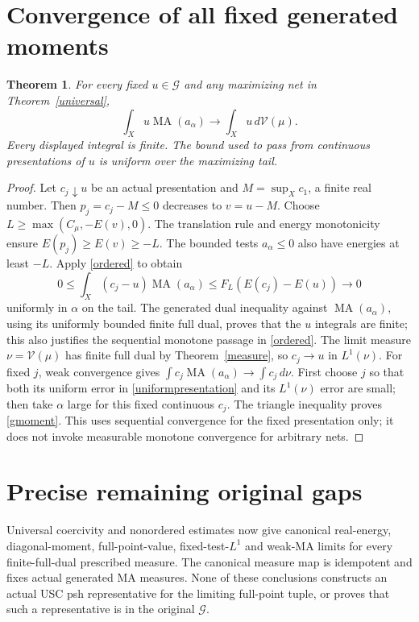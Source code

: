 \documentclass[11pt]{article}
\newtheorem{theorem}{Theorem}
\newcommand{\G}{\mathcal G}
\newcommand{\MA}{\operatorname{MA}}
\begin{document}
\section{Convergence of all fixed generated moments}
\begin{theorem}\label{generatedmoment}
For every fixed $u\in\G$ and any maximizing net in
Theorem~\ref{universal},
\begin{equation}\label{gmoment}
 \int_Xu\MA(a_\alpha)\longrightarrow
                      \int_Xu\,d\mathcal V(\mu).
\end{equation}
Every displayed integral is finite. The bound used to pass from
continuous presentations of $u$ is uniform over the maximizing tail.
\end{theorem}
\begin{proof}
Let $c_j\downarrow u$ be an actual presentation and
$M=\sup_Xc_1$, a finite real number. Then $p_j=c_j-M\le0$
decreases to $v=u-M$. Choose
$L\ge\max(C_\mu,-E(v),0)$. The translation rule and energy
monotonicity ensure $E(p_j)\ge E(v)\ge-L$.
The bounded tests $a_\alpha\le0$ also have energies at least
$-L$. Apply \eqref{ordered} to obtain
\begin{equation}\label{uniformpresentation}
 0\le\int_X(c_j-u)\MA(a_\alpha)
       \le F_L(E(c_j)-E(u))\longrightarrow0
\end{equation}
uniformly in $\alpha$ on the tail. The generated dual inequality
against $\MA(a_\alpha)$, using its uniformly bounded finite
full dual, proves that the $u$ integrals are finite; this also
justifies the sequential monotone passage in \eqref{ordered}.
The limit measure $\nu=\mathcal V(\mu)$ has finite full dual
by Theorem~\ref{measure}, so $c_j\to u$ in $L^1(\nu)$.
For fixed $j$, weak convergence gives
$\int c_j\MA(a_\alpha)\to\int c_j\,d\nu$.
First choose $j$ so that both its uniform error in
\eqref{uniformpresentation} and its $L^1(\nu)$ error are small;
then take $\alpha$ large for this fixed continuous $c_j$.
The triangle inequality proves \eqref{gmoment}.
This uses sequential convergence for the fixed presentation only;
it does not invoke measurable monotone convergence for arbitrary nets.
\end{proof}

\section{Precise remaining original gaps}
Universal coercivity and nonordered estimates now give canonical
real-energy, diagonal-moment, full-point-value, fixed-test-$L^1$ and
weak-MA limits for every finite-full-dual prescribed measure.
The canonical measure map is idempotent and fixes actual generated
MA measures. None of these conclusions constructs an actual USC
psh representative for the limiting full-point tuple, or proves
that such a representative is in the original $\G$.
\end{document}
